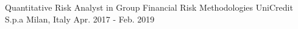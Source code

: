 \begin{cventries}
    
  \cventry
    {Quantitative Risk Analyst in Group Financial Risk Methodologies}
    {UniCredit S.p.a}
    {Milan, Italy}
    {Apr. 2017 - Feb. 2019}
    {
    }
    

\end{cventries}
